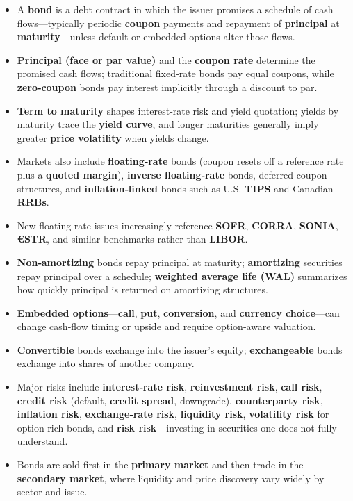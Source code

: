 \documentclass[
  letterpaper,
  DIV=11,
  numbers=noendperiod]{scrartcl}
\begin{document}
\begin{itemize}
\item
  A \textbf{bond} is a debt contract in which the issuer promises a
  schedule of cash flows---typically periodic \textbf{coupon} payments
  and repayment of \textbf{principal} at \textbf{maturity}---unless
  default or embedded options alter those flows.
\item
  \textbf{Principal (face or par value)} and the \textbf{coupon rate}
  determine the promised cash flows; traditional fixed‑rate bonds pay
  equal coupons, while \textbf{zero‑coupon} bonds pay interest
  implicitly through a discount to par.
\item
  \textbf{Term to maturity} shapes interest‑rate risk and yield
  quotation; yields by maturity trace the \textbf{yield curve}, and
  longer maturities generally imply greater \textbf{price volatility}
  when yields change.
\item
  Markets also include \textbf{floating‑rate} bonds (coupon resets off a
  reference rate plus a \textbf{quoted margin}), \textbf{inverse
  floating‑rate} bonds, deferred‑coupon structures, and
  \textbf{inflation‑linked} bonds such as U.S. \textbf{TIPS} and
  Canadian \textbf{RRBs}.
\item
  New floating‑rate issues increasingly reference \textbf{SOFR},
  \textbf{CORRA}, \textbf{SONIA}, \textbf{€STR}, and similar benchmarks
  rather than \textbf{LIBOR}.
\item
  \textbf{Non‑amortizing} bonds repay principal at maturity;
  \textbf{amortizing} securities repay principal over a schedule;
  \textbf{weighted average life (WAL)} summarizes how quickly principal
  is returned on amortizing structures.
\item
  \textbf{Embedded options}---\textbf{call}, \textbf{put},
  \textbf{conversion}, and \textbf{currency choice}---can change
  cash‑flow timing or upside and require option‑aware valuation.
\item
  \textbf{Convertible} bonds exchange into the issuer's equity;
  \textbf{exchangeable} bonds exchange into shares of another company.
\item
  Major risks include \textbf{interest‑rate risk}, \textbf{reinvestment
  risk}, \textbf{call risk}, \textbf{credit risk} (default,
  \textbf{credit spread}, downgrade), \textbf{counterparty risk},
  \textbf{inflation risk}, \textbf{exchange‑rate risk},
  \textbf{liquidity risk}, \textbf{volatility risk} for option‑rich
  bonds, and \textbf{risk risk}---investing in securities one does not
  fully understand.
\item
  Bonds are sold first in the \textbf{primary market} and then trade in
  the \textbf{secondary market}, where liquidity and price discovery
  vary widely by sector and issue.
\end{itemize}
\end{document}

